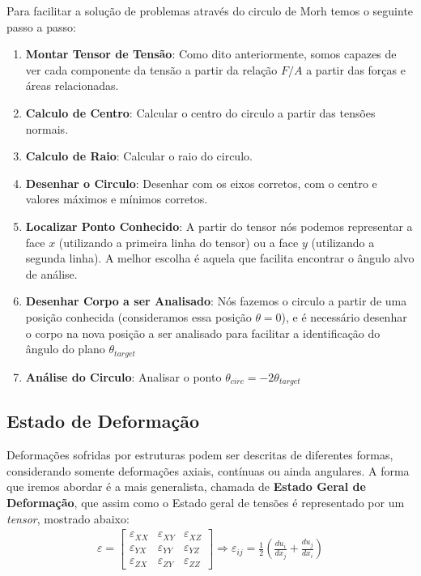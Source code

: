 \documentclass{article}
\begin{document}
Para facilitar a solução de problemas através do circulo de Morh temos o seguinte passo a passo:
\begin{enumerate}
    \item \textbf{Montar Tensor de Tensão}: Como dito anteriormente, somos capazes de ver cada componente da tensão a partir da relação $F/A$ a partir das forças e áreas relacionadas.
    \item \textbf{Calculo de Centro}: Calcular o centro do circulo a partir das tensões normais.
    \item \textbf{Calculo de Raio}: Calcular o raio do circulo.
    \item \textbf{Desenhar o Circulo}: Desenhar com os eixos corretos, com o centro e valores máximos e mínimos corretos.
    \item \textbf{Localizar Ponto Conhecido}: A partir do tensor nós podemos representar a face $x$ (utilizando a primeira linha do tensor) ou a face $y$ (utilizando a segunda linha). A melhor escolha é aquela que facilita encontrar o ângulo alvo de análise.
    \item \textbf{Desenhar Corpo a ser Analisado}: Nós fazemos o circulo a partir de uma posição conhecida (consideramos essa posição $\theta=0$), e é necessário desenhar o corpo na nova posição a ser analisado para facilitar a identificação do ângulo do plano $\theta_{target}$
    \item \textbf{Análise do Circulo}: Analisar o ponto $\theta_{circ} = -2 \theta_{target}$
\end{enumerate}

\subsection{Estado de Deformação}
Deformações sofridas por estruturas podem ser descritas de diferentes formas, considerando somente deformações axiais, contínuas ou ainda angulares. A forma que iremos abordar é a mais generalista, chamada de \textbf{Estado Geral de Deformação}, que assim como o Estado geral de tensões é representado por um \emph{tensor}, mostrado abaixo:
\begin{align*}
    \varepsilon =  \begin{bmatrix}
                       \varepsilon_{XX} & \varepsilon_{XY} & \varepsilon_{XZ} \\
                       \varepsilon_{YX} & \varepsilon_{YY} & \varepsilon_{YZ} \\
                       \varepsilon_{ZX} & \varepsilon_{ZY} & \varepsilon_{ZZ}
                   \end{bmatrix}
    \Rightarrow \varepsilon_{ij} = \frac{1}{2}\left(\frac{du_i}{dx_j}+\frac{du_j}{dx_i}\right)
\end{align*}
\end{document}

